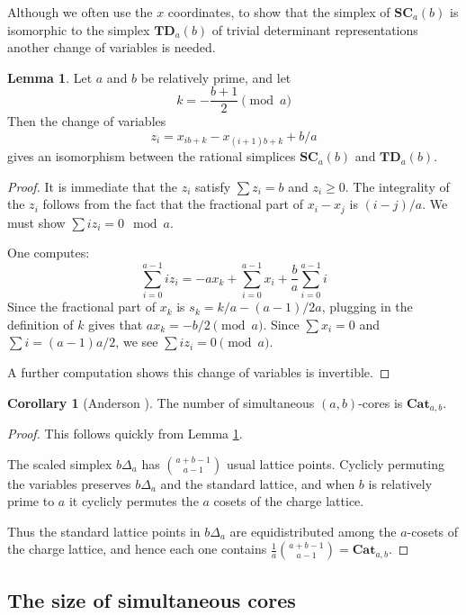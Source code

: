 \documentclass{amsart}[12pt]
\theoremstyle{definition}
\newtheorem{lemma}[dummy]{Lemma}
\newtheorem{corollary}[dummy]{Corollary}
\newcommand{\SC}{\mathbf{SC}}
\newcommand{\TD}{\mathbf{TD}}
\newcommand{\Cat}{\mathbf{Cat}}
\begin{document}
Although we often use the $x$ coordinates, to show that the simplex of $\SC_a(b)$ is isomorphic to the simplex $\TD_a(b)$ of trivial determinant representations another change of variables is needed.
 
\begin{lemma} \label{lem:standardsimplex}
Let $a$ and $b$ be relatively prime, and let 
$$k=-\frac{b+1}{2}\pmod a$$
  Then the change of variables
$$z_i=x_{ib+k}-x_{(i+1)b+k}+b/a$$
gives an isomorphism between the rational simplices $\SC_a(b)$ and $\TD_a(b)$. 
\end{lemma}

\begin{proof}
It is immediate that the $z_i$ satisfy $\sum z_i=b$ and $z_i\geq 0$.  The integrality of the $z_i$ follows from the fact that the fractional part of $x_i-x_j$ is $(i-j)/a$.  We must show $\sum iz_i=0\mod a$.

One computes:
$$\sum_{i=0}^{a-1} iz_i=-ax_k+\sum_{i=0}^{a-1} x_i+\frac{b}{a}\sum_{i=0}^{a-1} i$$
Since the fractional part of $x_k$ is $s_k=k/a-(a-1)/2a$, plugging in the definition of $k$ gives that $ax_k=-b/2\pmod a$.  Since $\sum x_i=0$ and $\sum i=(a-1)a/2$, we see $\sum iz_i=0\pmod a$.

A further computation shows this change of variables is invertible.
\end{proof}


\begin{corollary}[Anderson \cite{anderson}] \label{cor:anderson} The number of simultaneous $(a,b)$-cores is $\Cat_{a,b}$.
\end{corollary}

\begin{proof} This follows quickly from Lemma \ref{lem:standardsimplex}.


The scaled simplex $b\Delta_a$ has $\binom{a+b-1}{a-1}$
  usual lattice points.  Cyclicly permuting the variables preserves
  $b\Delta_a$ and the standard lattice, and when $b$ is relatively prime to $a$ it cyclicly permutes the $a$ cosets of the charge lattice.   

Thus the standard lattice points in
  $b\Delta_a$ are equidistributed among the $a$-cosets of the
  charge lattice, and hence each one contains $\frac{1}{a}\binom{a+b-1}{a-1}=\Cat_{a,b}$.


\end{proof}

\subsection{The size of simultaneous cores}
\end{document}
